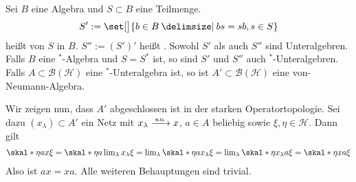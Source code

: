 \begin{definitionP}[{name=[Kommutante und Bikommutante]},label=def:65]
	Sei $B$ eine Algebra und $S \subset B$ eine Teilmenge.
	\[
		S' := \set[\big]{b \in B \given bs=sb, s \in S}
	\]
	heißt  von $S$ in $B$. 
	$S'' := (S')'$ heißt .
	Sowohl $S'$ als auch $S''$ sind Unteralgebren.
	Falls $B$ eine $^*$-Algebra und $S=S^*$ ist, so sind $S'$ und $S''$ auch $^*$-Unteralgebren.
	Falls $A \subset \mathcal{B}(\mathcal{H})$ eine $^*$-Unteralgebra ist, so ist $A' \subset \mathcal{B}(\mathcal{H})$ eine von-Neumann-Algebra.
\end{definitionP}
\begin{beweis}
	Wir zeigen nun, dass $A'$ abgeschlossen ist in der starken Operatortopologie.
	Sei dazu $(x_\lambda) \subset A'$ ein Netz mit $x_\lambda \grenzw{\raisemath{-2pt}{\so}} x$, $a \in A$ beliebig sowie $\xi,\eta \in \mathcal{H}$.
	Dann gilt
	\begin{align}
		\skal*{\eta}{a x \xi} = \skal*{\eta}{ a \lim\nolimits_\lambda x_\lambda \xi} =\lim\nolimits_\lambda \skal*{\eta}{a x_\lambda \xi} = \lim\nolimits_\lambda \skal*{\eta}{x_\lambda a \xi} = \skal*{\eta}{x a \xi}
	\end{align}
	Also ist $a x= x a$.
	Alle weiteren Behauptungen sind trivial.
\end{beweis}

